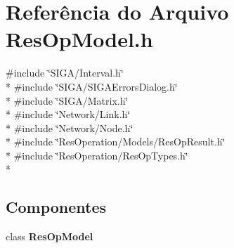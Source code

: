 \section{Referência do Arquivo Res\+Op\+Model.\+h}
\label{_res_op_model_8h}
{\ttfamily \#include \char`\"{}S\+I\+G\+A/\+Interval.\+h\char`\"{}}\\*
{\ttfamily \#include \char`\"{}S\+I\+G\+A/\+S\+I\+G\+A\+Errors\+Dialog.\+h\char`\"{}}\\*
{\ttfamily \#include \char`\"{}S\+I\+G\+A/\+Matrix.\+h\char`\"{}}\\*
{\ttfamily \#include \char`\"{}Network/\+Link.\+h\char`\"{}}\\*
{\ttfamily \#include \char`\"{}Network/\+Node.\+h\char`\"{}}\\*
{\ttfamily \#include \char`\"{}Res\+Operation/\+Models/\+Res\+Op\+Result.\+h\char`\"{}}\\*
{\ttfamily \#include \char`\"{}Res\+Operation/\+Res\+Op\+Types.\+h\char`\"{}}\\*
\subsection*{Componentes}
\begin{DoxyCompactItemize}
\item 
class {\bf Res\+Op\+Model}
\end{DoxyCompactItemize}
